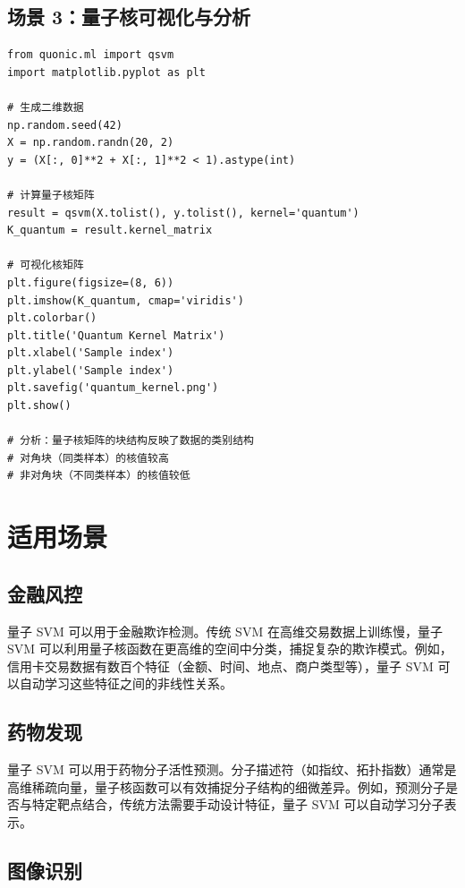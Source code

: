 \documentclass[12pt,a4paper]{article}
\begin{document}
\subsection{场景 3：量子核可视化与分析}

\begin{verbatim}
from quonic.ml import qsvm
import matplotlib.pyplot as plt

# 生成二维数据
np.random.seed(42)
X = np.random.randn(20, 2)
y = (X[:, 0]**2 + X[:, 1]**2 < 1).astype(int)

# 计算量子核矩阵
result = qsvm(X.tolist(), y.tolist(), kernel='quantum')
K_quantum = result.kernel_matrix

# 可视化核矩阵
plt.figure(figsize=(8, 6))
plt.imshow(K_quantum, cmap='viridis')
plt.colorbar()
plt.title('Quantum Kernel Matrix')
plt.xlabel('Sample index')
plt.ylabel('Sample index')
plt.savefig('quantum_kernel.png')
plt.show()

# 分析：量子核矩阵的块结构反映了数据的类别结构
# 对角块（同类样本）的核值较高
# 非对角块（不同类样本）的核值较低
\end{verbatim}

\section{适用场景}

\subsection{金融风控}

量子 SVM 可以用于金融欺诈检测。传统 SVM 在高维交易数据上训练慢，量子 SVM 可以利用量子核函数在更高维的空间中分类，捕捉复杂的欺诈模式。例如，信用卡交易数据有数百个特征（金额、时间、地点、商户类型等），量子 SVM 可以自动学习这些特征之间的非线性关系。

\subsection{药物发现}

量子 SVM 可以用于药物分子活性预测。分子描述符（如指纹、拓扑指数）通常是高维稀疏向量，量子核函数可以有效捕捉分子结构的细微差异。例如，预测分子是否与特定靶点结合，传统方法需要手动设计特征，量子 SVM 可以自动学习分子表示。

\subsection{图像识别}
\end{document}
